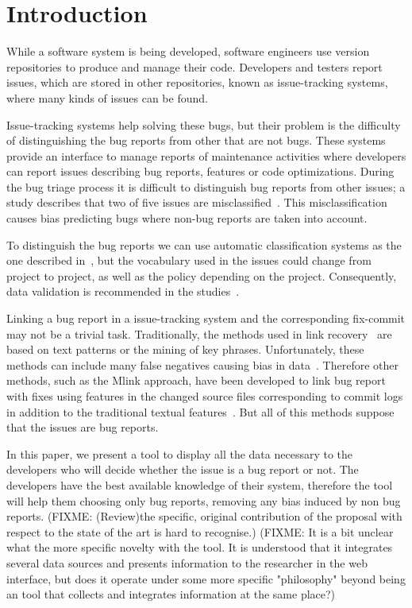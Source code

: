 \documentclass[ifip]{svmult}
\begin{document}
\section{Introduction}
\label{sec:1}


While a software system is being developed, software engineers use version repositories to produce and manage their code. Developers and testers report issues, which are stored in other repositories, known as issue-tracking systems, where many kinds of issues can be found.

Issue-tracking systems help solving these bugs, but their problem is the difficulty of distinguishing the bug reports from other that are not bugs. These systems provide an interface to manage reports of maintenance activities where developers can report issues describing bug reports, features or code optimizations. During the bug triage process it is difficult to distinguish bug reports from other issues; a study describes that two of five issues are misclassified~\cite{Herzig}. This misclassification causes bias predicting bugs where non-bug reports are taken into account.

To distinguish the bug reports we can use automatic classification systems as the one described in~\cite{Antoniol}, but the vocabulary used in the issues could change from project to project, as well as the policy depending on the project. Consequently, data validation is recommended in the studies~\cite{Herzig}.

Linking a bug report in a issue-tracking system and the corresponding fix-commit may not be a trivial task. Traditionally, the methods used in link recovery~\cite{Zimmermann, Thomas} are based on text patterns or the mining of key phrases. Unfortunately, these methods can include many false negatives causing bias in data~\cite{Bird, NguyenTH}. Therefore other methods, such as the Mlink approach, have been developed to link bug report with fixes using features in the changed source files corresponding to commit logs in addition to the traditional textual features~\cite{Nguyen}. But all of this methods suppose that the issues are bug reports.

In this paper, we present a tool to display all the data necessary to the developers who will decide whether the issue is a bug report or not. The developers have the best available knowledge of their system, therefore the tool will help them choosing only bug reports, removing any bias induced by non bug reports. (FIXME: (Review)the specific, original contribution of the proposal with respect to the state of the art is hard to recognise.)
(FIXME:  It is a bit unclear what the more specific novelty with the tool. It is understood that it integrates several data sources and presents information to the researcher in the web interface, but does it operate under some more specific "philosophy" beyond being an tool that collects and integrates information at the same place?)
\end{document}
